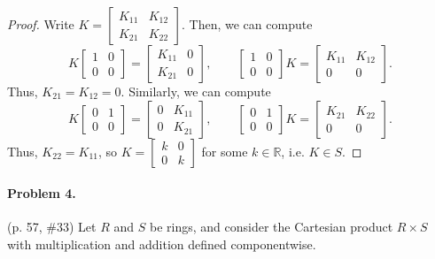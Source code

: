 \documentclass[12pt]{article}
\begin{document}
\begin{enumerate}
{        \begin{proof}
            Write $K = \begin{bmatrix}K_{11} & K_{12} \\ K_{21} & K_{22}\end{bmatrix}$. Then, we can compute 
            \[K \begin{bmatrix} 1 & 0 \\ 0 & 0 \end{bmatrix}= \begin{bmatrix}
                K_{11} & 0 \\
                K_{21} & 0
            \end{bmatrix}, \qquad \begin{bmatrix} 1 & 0 \\ 0 & 0 \end{bmatrix} K = \begin{bmatrix}
                K_{11} & K_{12} \\
                0 & 0
            \end{bmatrix}.\]
            Thus, $K_{21} = K_{12} = 0$. Similarly, we can compute
            \[
            K \begin{bmatrix} 0 & 1 \\ 0 & 0 \end{bmatrix} = \begin{bmatrix}0 & K_{11} \\ 0 & K_{21} \end{bmatrix}, \qquad \begin{bmatrix}0 & 1 \\ 0 & 0 \end{bmatrix} K = \begin{bmatrix} K_{21} & K_{22} \\ 0 & 0 \end{bmatrix}.
            \]
            Thus, $K_{22} = K_{11}$, so $K = \begin{bmatrix} k & 0 \\ 0 & k \end{bmatrix}$ for some $k \in \mathbb R$, i.e. $K \in S$.
        \end{proof}
    }
\end{enumerate}

\paragraph{Problem 4.} (p. 57, \#33) Let $R$ and $S$ be rings, and consider the Cartesian product $R \times S$ with multiplication and addition defined componentwise. 
\end{document}
